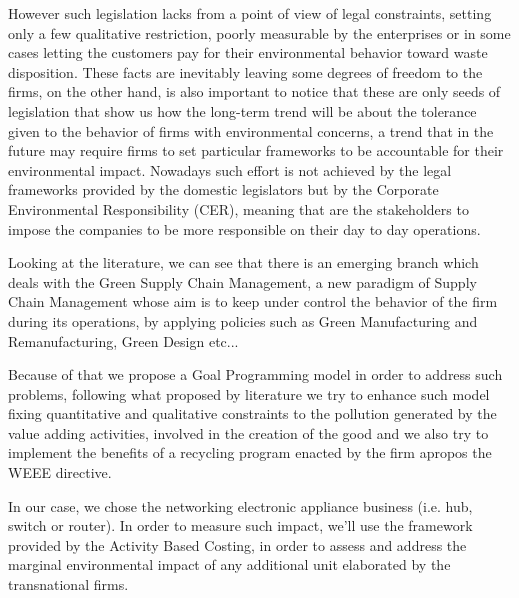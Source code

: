 \documentclass{article}
\begin{document}
  However such legislation lacks from a point of view of legal constraints, setting only a few qualitative restriction, poorly measurable by the enterprises or in some cases letting the customers pay for their environmental behavior toward waste disposition. These facts are inevitably leaving some degrees of freedom to the firms, on the other hand, is also important to notice that these are only seeds of legislation that show us how the long-term trend will be about the tolerance given to the behavior of firms with environmental concerns, a trend that in the future may require firms to set particular frameworks to be accountable for their environmental impact. Nowadays such effort is not achieved by the legal frameworks provided by the domestic legislators but by the Corporate Environmental Responsibility (CER), meaning that are the stakeholders to impose the companies to be more responsible on their day to day operations.

  Looking at the literature, we can see that there is an emerging branch which deals with the Green Supply Chain Management, a new paradigm of Supply Chain Management whose aim is to keep under control the behavior of the firm during its operations, by applying policies such as Green Manufacturing and Remanufacturing, Green Design etc...

  Because of that we propose a Goal Programming model in order to address such problems, following what proposed by literature we try to enhance such model fixing quantitative and qualitative constraints to the pollution generated by the value adding activities, involved in the creation of the good and we also try to implement the benefits of a recycling program enacted by the firm apropos the WEEE directive.

  In our case, we chose the networking electronic appliance business (i.e. hub, switch or router).  In order to measure such impact, we'll use the framework provided by the Activity Based Costing, in order to assess and address the marginal environmental impact of any additional unit elaborated by the transnational firms.
\end{document}
